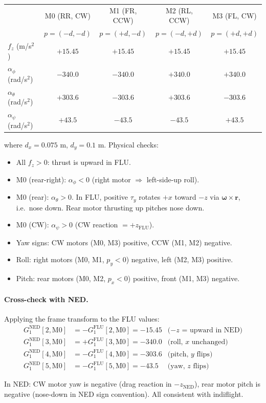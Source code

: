 \documentclass[11pt]{article}
\newcommand{\ned}{\mathrm{NED}}
\newcommand{\flu}{\mathrm{FLU}}
\begin{document}
\begin{center}
\begin{tabular}{lcccc}
    \toprule
    & M0 (RR, CW) & M1 (FR, CCW) & M2 (RL, CCW) & M3 (FL, CW) \\
    & $p=(-d,-d)$ & $p=(+d,-d)$ & $p=(-d,+d)$ & $p=(+d,+d)$ \\
    \midrule
    $f_z$ (m/s$^2$)           & $+15.45$ & $+15.45$ & $+15.45$ & $+15.45$ \\
    $\alpha_\phi$ (rad/s$^2$) & $-340.0$ & $-340.0$ & $+340.0$ & $+340.0$ \\
    $\alpha_\theta$ (rad/s$^2$)& $+303.6$ & $-303.6$ & $+303.6$ & $-303.6$ \\
    $\alpha_\psi$ (rad/s$^2$) & $+43.5$  & $-43.5$  & $-43.5$  & $+43.5$  \\
    \bottomrule
\end{tabular}
\end{center}

\noindent where $d_x = 0.075$ m, $d_y = 0.1$ m. Physical checks:
\begin{itemize}
    \item All $f_z > 0$: thrust is upward in FLU. \checkmark
    \item M0 (rear-right): $\alpha_\phi < 0$ (right motor $\Rightarrow$ left-side-up roll). \checkmark
    \item M0 (rear): $\alpha_\theta > 0$. In FLU, positive $\tau_y$ rotates $+x$ toward
        $-z$ via $\bm{\omega} \times \bm{r}$, i.e.\ nose down. Rear motor thrusting
        up pitches nose down. \checkmark
    \item M0 (CW): $\alpha_\psi > 0$ (CW reaction $= +z_{\flu}$). \checkmark
    \item Yaw signs: CW motors (M0, M3) positive, CCW (M1, M2) negative. \checkmark
    \item Roll: right motors (M0, M1, $p_y < 0$) negative, left (M2, M3) positive. \checkmark
    \item Pitch: rear motors (M0, M2, $p_x < 0$) positive, front (M1, M3) negative. \checkmark
\end{itemize}

\paragraph{Cross-check with NED.} Applying the frame transform to the FLU values:
\begin{align*}
    G_1^{\ned}[2,\text{M0}] &= -G_1^{\flu}[2,\text{M0}] = -15.45 & \text{($-z$ = upward in NED)} \\
    G_1^{\ned}[3,\text{M0}] &= +G_1^{\flu}[3,\text{M0}] = -340.0 & \text{(roll, $x$ unchanged)} \\
    G_1^{\ned}[4,\text{M0}] &= -G_1^{\flu}[4,\text{M0}] = -303.6 & \text{(pitch, $y$ flips)} \\
    G_1^{\ned}[5,\text{M0}] &= -G_1^{\flu}[5,\text{M0}] = -43.5  & \text{(yaw, $z$ flips)}
\end{align*}

In NED: CW motor yaw is negative (drag reaction in $-z_{\ned}$), rear motor pitch is
negative (nose-down in NED sign convention). All consistent with indiflight. \checkmark
\end{document}
